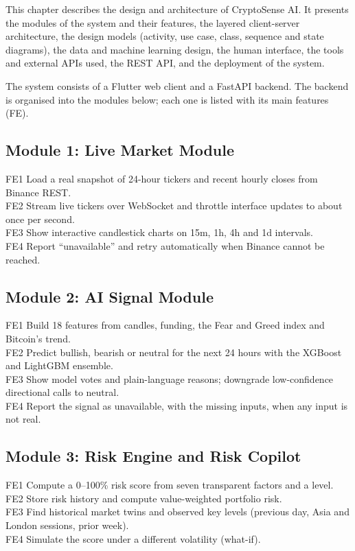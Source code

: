 
\chapteroverview
This chapter describes the design and architecture of CryptoSense AI. It presents the modules of the system and their features, the layered client-server architecture, the design models (activity, use case, class, sequence and state diagrams), the data and machine learning design, the human interface, the tools and external APIs used, the REST API, and the deployment of the system.

The system consists of a Flutter web client and a FastAPI backend. The backend is organised into the modules below; each one is listed with its main features (FE).

\subsection*{Module 1: Live Market Module}
FE1 Load a real snapshot of 24-hour tickers and recent hourly closes from Binance REST.\\
FE2 Stream live tickers over WebSocket and throttle interface updates to about once per second.\\
FE3 Show interactive candlestick charts on 15m, 1h, 4h and 1d intervals.\\
FE4 Report ``unavailable'' and retry automatically when Binance cannot be reached.

\subsection*{Module 2: AI Signal Module}
FE1 Build 18 features from candles, funding, the Fear and Greed index and Bitcoin's trend.\\
FE2 Predict bullish, bearish or neutral for the next 24 hours with the XGBoost and LightGBM ensemble.\\
FE3 Show model votes and plain-language reasons; downgrade low-confidence directional calls to neutral.\\
FE4 Report the signal as unavailable, with the missing inputs, when any input is not real.

\subsection*{Module 3: Risk Engine and Risk Copilot}
FE1 Compute a 0--100\% risk score from seven transparent factors and a level.\\
FE2 Store risk history and compute value-weighted portfolio risk.\\
FE3 Find historical market twins and observed key levels (previous day, Asia and London sessions, prior week).\\
FE4 Simulate the score under a different volatility (what-if).

